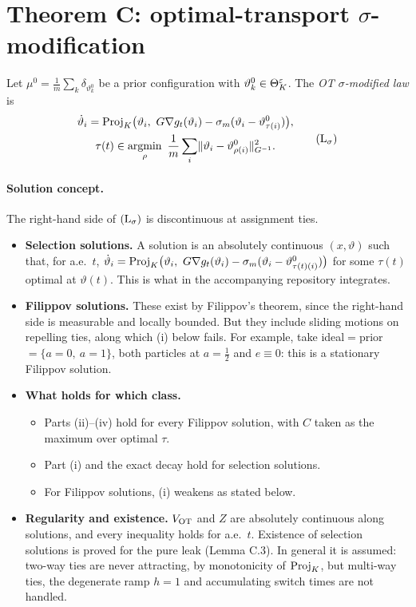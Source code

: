 \section{Theorem C: optimal-transport \texorpdfstring{$\sigma$}{sigma}-modification}\label{sec:thmC}

Let $\mu^0 = \frac1m\sum_k \delta_{\vartheta^0_k}$ be a prior configuration with $\vartheta^0_k \in \Theta_K^{\varepsilon}$. The
\emph{OT $\sigma$-modified law} is
\begin{equation}\label{eq:thmC:Lsigma}
  \begin{gathered}
    \dot\vartheta_i = \Proj\bigl(\vartheta_i,\ G\nabla g_t(\vartheta_i) - \sigma_m(\vartheta_i - \vartheta^0_{\tau(i)})\bigr),\\
    \tau(t) \in \operatorname*{argmin}_{\rho}\ \frac1m\sum_i \norm{\vartheta_i - \vartheta^0_{\rho(i)}}^2_{\Ginv}.
  \end{gathered}
  \tag{$\mathrm{L}_\sigma$}
\end{equation}

\paragraph{Solution concept.} The right-hand side of $(\mathrm{L}_\sigma)$ is discontinuous at assignment ties.
\begin{itemize}
  \item \textbf{Selection solutions.} A solution is an absolutely continuous $(x,\vartheta)$ such that, for a.e.\ $t$,
    $\dot\vartheta_i = \Proj\bigl(\vartheta_i,\ G\nabla g_t(\vartheta_i) - \sigma_m(\vartheta_i -
    \vartheta^0_{\tau(t)(i)})\bigr)$ for some $\tau(t)$ optimal at $\vartheta(t)$. This is what
     in the accompanying repository integrates.
  \item \textbf{Filippov solutions.} These exist by Filippov's theorem, since the right-hand side is measurable and
    locally bounded. But they include sliding motions on repelling ties, along which (i) below fails. For example,
    take ideal${}={}$prior${}=\{a=0,\ a=1\}$, both particles at $a=\frac12$ and $e\equiv0$: this is a stationary
    Filippov solution.
  \item \textbf{What holds for which class.}
    \begin{itemize}
      \item Parts (ii)--(iv) hold for every Filippov solution, with $C$ taken as the maximum over optimal $\tau$.
      \item Part (i) and the exact decay hold for selection solutions.
      \item For Filippov solutions, (i) weakens as stated below.
    \end{itemize}
  \item \textbf{Regularity and existence.} $V_{\mathrm{OT}}$ and $Z$ are absolutely continuous along solutions, and every
    inequality holds for a.e.\ $t$. Existence of selection solutions is proved for the pure leak (Lemma C.3). In
    general it is assumed: two-way ties are never attracting, by monotonicity of $\operatorname{Proj}_K$, but multi-way ties, the
    degenerate ramp $h=1$ and accumulating switch times are not handled.
\end{itemize}

